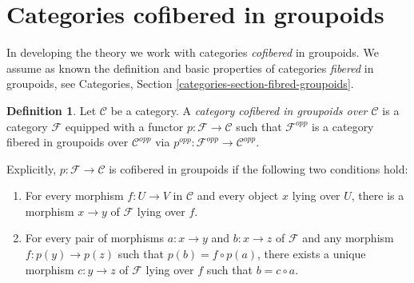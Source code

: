 \documentclass{stacks-project}
\theoremstyle{plain}
\theoremstyle{definition}
\newtheorem{definition}[subsection]{Definition}
\theoremstyle{remark}
\numberwithin{equation}{subsection}
\begin{document}
\section{Categories cofibered in groupoids}
\label{section-preliminary}

\noindent
In developing the theory we work with categories {\it cofibered} in groupoids.
 We assume as known the definition and basic properties of categories
{\it fibered} in groupoids, see
Categories, Section \ref{categories-section-fibred-groupoids}.

\begin{definition}
\label{definition-category-cofibred-groupoids}
Let $\mathcal{C}$ be a category.  A {\it category cofibered in groupoids over
$\mathcal{C}$} is a category $\mathcal{F}$ equipped with a functor
$p: \mathcal{F} \to \mathcal{C}$ such that $\mathcal{F}^{opp}$ is a category
fibered in groupoids over $\mathcal{C}^{opp}$ via
$p^{opp}: \mathcal{F}^{opp} \to \mathcal{C}^{opp}$.
\end{definition}

\noindent
Explicitly, $p: \mathcal{F} \to \mathcal{C}$ is cofibered in groupoids if
the following two conditions hold:
\begin{enumerate}
\item For every morphism $f: U \to V$ in $\mathcal{C}$ and every object
$x$ lying over $U$, there is a morphism $x \to y$ of $\mathcal{F}$ lying
over $f$.
\item For every pair of morphisms $a: x \to y$ and $b: x \to z$
of $\mathcal{F}$ and any morphism $f: p(y) \to p(z)$ such that $p(b) = f
\circ p(a)$, there exists a unique morphism $c: y \to z$ of $\mathcal
F$ lying over $f$ such that $b = c \circ a$.
\end{enumerate}
\end{document}
